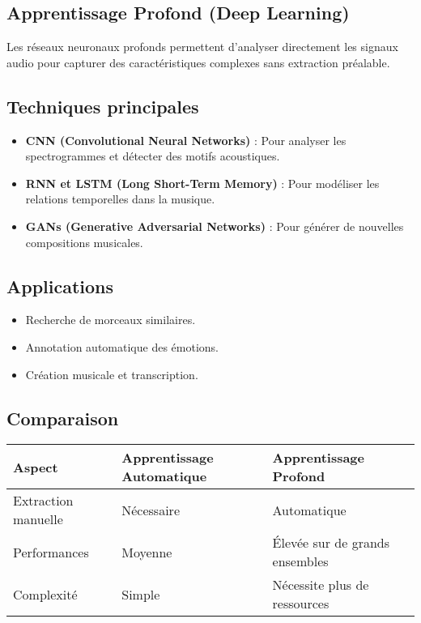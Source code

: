 \begin{section}
\section{Apprentissage Profond (Deep Learning)}
Les réseaux neuronaux profonds permettent d’analyser directement les signaux audio pour capturer des caractéristiques complexes sans extraction préalable.

\subsection*{Techniques principales}
\begin{itemize}
    \item \textbf{CNN (Convolutional Neural Networks)} : Pour analyser les spectrogrammes et détecter des motifs acoustiques.
    \item \textbf{RNN et LSTM (Long Short-Term Memory)} : Pour modéliser les relations temporelles dans la musique.
    \item \textbf{GANs (Generative Adversarial Networks)} : Pour générer de nouvelles compositions musicales.
\end{itemize}

\subsection*{Applications}
\begin{itemize}
    \item Recherche de morceaux similaires.
    \item Annotation automatique des émotions.
    \item Création musicale et transcription.
\end{itemize}

\section{Comparaison}
\renewcommand{\arraystretch}{1.5}
\begin{tabular}{|>{\centering\arraybackslash}p{4cm}|>{\centering\arraybackslash}p{5cm}|>{\centering\arraybackslash}p{5cm}|}
\hline
\textbf{Aspect} & \textbf{Apprentissage Automatique} & \textbf{Apprentissage Profond} \\
\hline
Extraction manuelle & Nécessaire & Automatique \\
\hline
Performances & Moyenne & Élevée sur de grands ensembles \\
\hline
Complexité & Simple & Nécessite plus de ressources \\
\hline
\end{tabular}


\end{section} 